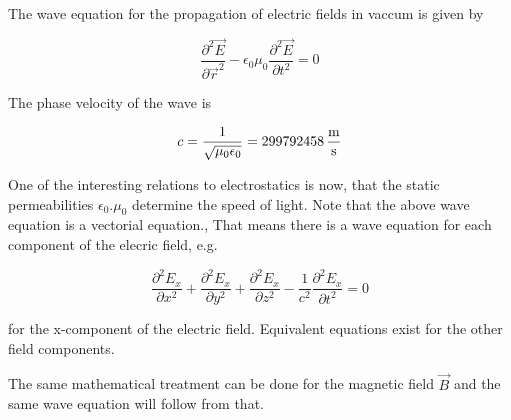 \documentclass[
  a4paper,
]{book}
\begin{document}
\begin{tcolorbox}[enhanced jigsaw, coltitle=black, title=\textcolor{quarto-callout-note-color}{\faInfo}\hspace{0.5em}{Wave Equation}, colframe=quarto-callout-note-color-frame, toprule=.15mm, opacitybacktitle=0.6, left=2mm, opacityback=0, breakable, toptitle=1mm, bottomtitle=1mm, leftrule=.75mm, arc=.35mm, titlerule=0mm, colbacktitle=quarto-callout-note-color!10!white, rightrule=.15mm, bottomrule=.15mm, colback=white]

The wave equation for the propagation of electric fields in vaccum is
given by

\[
\frac{\partial^2 \vec{E}}{\partial \vec{r}^2}-\epsilon_0\mu_0 \frac{\partial^2\vec{E}}{\partial t^2}=0
\]

The phase velocity of the wave is

\[
c=\frac{1}{\sqrt{\mu_0\epsilon_0}}=299792458 \, {\rm\frac{m}{s}}
\]

\end{tcolorbox}

One of the interesting relations to electrostatics is now, that the
static permeabilities \(\epsilon_0.\mu_0\) determine the speed of light.
Note that the above wave equation is a vectorial equation., That means
there is a wave equation for each component of the elecric field, e.g.

\[
\frac{\partial^2 E_x}{\partial x^2}+\frac{\partial^2 E_x}{\partial y^2}+\frac{\partial^2 E_x}{\partial z^2}-\frac{1}{c^2} \frac{\partial^2 E_x}{\partial t^2}=0
\]

for the x-component of the electric field. Equivalent equations exist
for the other field components.

The same mathematical treatment can be done for the magnetic field
\(\vec{B}\) and the same wave equation will follow from that.
\end{document}
